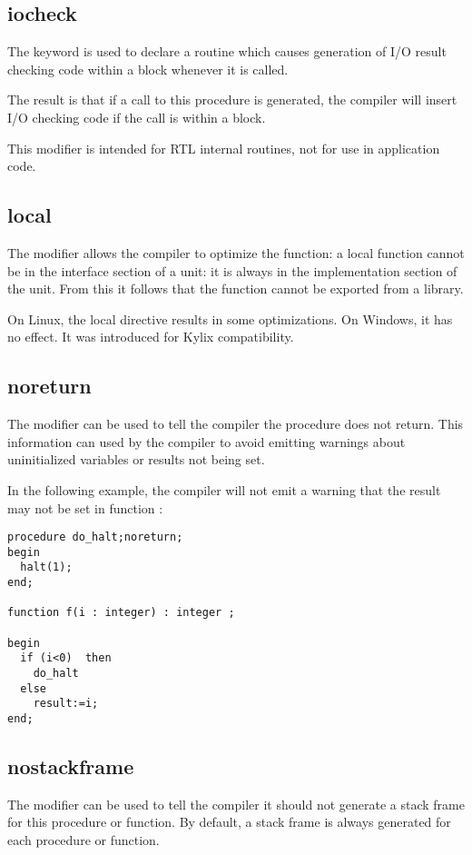 \subsection{iocheck}
\label{se:iocheck}
The  keyword is used to declare a routine which causes
generation of I/O result checking code within a 
block whenever it is called.

The result is that if a call to this procedure is generated, the compiler will 
insert I/O checking code if the call is within a  block.

This modifier is intended for RTL internal routines, not for use in
application code.

\subsection{local}
\label{se:local}
The  modifier allows the compiler to optimize the function: a local
function cannot be in the interface section of a unit: it is always in the
implementation section of the unit. From this it follows that the function
cannot be exported from a library. 

On Linux, the local directive results in some optimizations. On Windows, it
has no effect. It was introduced for Kylix compatibility.

\subsection{noreturn}
\label{se:noreturn}
The  modifier can be used to tell the compiler the procedure
does not return. This information can used by the compiler to avoid emitting
warnings about uninitialized variables or results not being set. 

In the following example, the compiler will not emit a warning that the
result may not be set in function :
\begin{verbatim}
procedure do_halt;noreturn;
begin
  halt(1);
end;

function f(i : integer) : integer ;

begin
  if (i<0)  then
    do_halt
  else
    result:=i;
end;
\end{verbatim}

\subsection{nostackframe}
\label{se:nostackframe}
The  modifier can be used to tell the compiler it should
not generate a stack frame for this procedure or function. By default, a
stack frame is always generated for each procedure or function.

